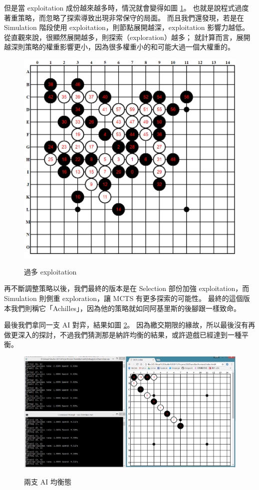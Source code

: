 \documentclass[12pt]{article}
\begin{document}
\begin{CJK}{UTF8}{bsmi}
但是當 exploitation 成份越來越多時，情況就會變得如圖 \ref{exploitation}。
也就是說程式過度著重策略，而忽略了探索導致出現非常保守的局面。
而且我們還發現，若是在 Simulation 階段使用 exploitation，則節點展開越深，exploitation 影響力越低。
從直觀來說，很顯然展開越多，則探索（exploration）越多；
就計算而言，展開越深則策略的權重影響更小，因為很多權重小的和可能大過一個大權重的。

\begin{figure}[h]
  \caption{過多 exploitation}
  \centering
  \includegraphics[width=.6\textwidth]{defense}
  \label{exploitation}
\end{figure}

再不斷調整策略以後，我們最終的版本是在 Selection 部份加強 exploitation，而 Simulation 則側重 exploration，讓 MCTS 有更多探索的可能性。
最終的這個版本我們則稱它「Achilles」，因為他的策略就如同阿基里斯的後腳跟一樣致命。

最後我們拿同一支 AI 對弈，結果如圖 \ref{equi}。
因為繳交期限的緣故，所以最後沒有再做更深入的探討，不過我們猜測那是納許均衡的結果，或許遊戲已經達到一種平衡。

\begin{figure}[h]
  \caption{兩支 AI 均衡態}
  \centering
  \includegraphics[width=1\textwidth]{equilibrium}
  \label{equi}
\end{figure}


\end{CJK}
\end{document}
